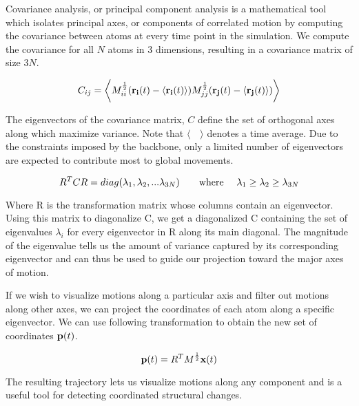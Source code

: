 Covariance analysis, or principal component analysis is a mathematical tool which isolates principal axes, or components of correlated motion by computing the covariance between atoms at every time point in the simulation. We compute the covariance for all $N$ atoms in $3$ dimensions, resulting in a covariance matrix of size $3N$.

\begin{equation}
C_{ij} = \bigg\langle M_{ii}^{\frac{1}{2}} (\mathbf{r_i}(t) - \langle \mathbf{r_i}(t) \rangle) M_{jj}^{\frac{1}{2}} (\mathbf{r_j}(t) - \langle \mathbf{r_j}(t) \rangle) \bigg\rangle
\end{equation}

The eigenvectors of the covariance matrix, $C$ define the set of orthogonal axes along which maximize variance. Note that $\langle \quad \rangle$ denotes a time average. Due to the constraints imposed by the backbone, only a limited number of eigenvectors are expected to contribute most to global movements.

\begin{equation}
R^{T}CR = diag(\lambda_1, \lambda_2, ... \lambda_{3N}) \text{\qquad where \quad} \lambda_1 \geq \lambda_2 \geq \lambda_{3N}
\end{equation}

Where R is the transformation matrix whose columns contain an eigenvector. Using this matrix to diagonalize C, we get a diagonalized C containing the set of eigenvalues $\lambda_i$ for every eigenvector in R along its main diagonal. The magnitude of the eigenvalue tells us the amount of variance captured by its corresponding eigenvector and can thus be used to guide our projection toward the major axes of motion.

If we wish to visualize motions along a particular axis and filter out motions along other axes, we can project the coordinates of each atom along a specific eigenvector. We can use following transformation to obtain the new set of coordinates $\mathbf{p}(t)$.

\begin{equation}
\mathbf{p}(t) = R^{T}M^{\frac{1}{2}}\mathbf{x}(t)
\end{equation}

The resulting trajectory lets us visualize motions along any component and is a useful tool for detecting coordinated structural changes. 

